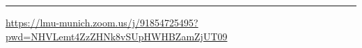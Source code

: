 \documentclass[12pt]{article}
\begin{document}
\begin{titlepage}
\begin{center}
\vspace{0.3cm}

\rule{\textwidth}{1pt}

\vspace{0.3cm}

\url{https://lmu-munich.zoom.us/j/91854725495?pwd=NHVLemt4ZzZHNk8vSUpHWHBZamZjUT09}

\end{center}
\end{titlepage}
\end{document}
